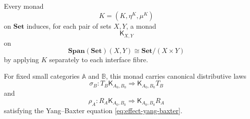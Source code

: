 \begin{proposition}
\label{prop:fibrewise-effect-doctrine-set}
    Every monad
    \[
        K=(K,\eta^K,\mu^K)
    \]
    on \(\mathbf{Set}\) induces, for each pair of sets \(X,Y\), a monad
    \[
        \mathsf K_{X,Y}
    \]
    on
    \[
        \mathbf{Span}(\mathbf{Set})(X,Y)
        \cong
        \mathbf{Set}/(X\times Y)
    \]
    by applying \(K\) separately to each interface fibre.

    For fixed small categories \(\mathbb A\) and \(\mathbb B\), this monad
    carries canonical distributive laws
    \[
        \sigma_B:
        T_B\mathsf K_{A_0,B_0}
        \Rightarrow
        \mathsf K_{A_0,B_0}T_B
    \]
    and
    \[
        \rho_A:
        R_A\mathsf K_{A_0,B_0}
        \Rightarrow
        \mathsf K_{A_0,B_0}R_A
    \]
    satisfying the Yang--Baxter equation
    \eqref{eq:effect-yang-baxter}.
\end{proposition}
